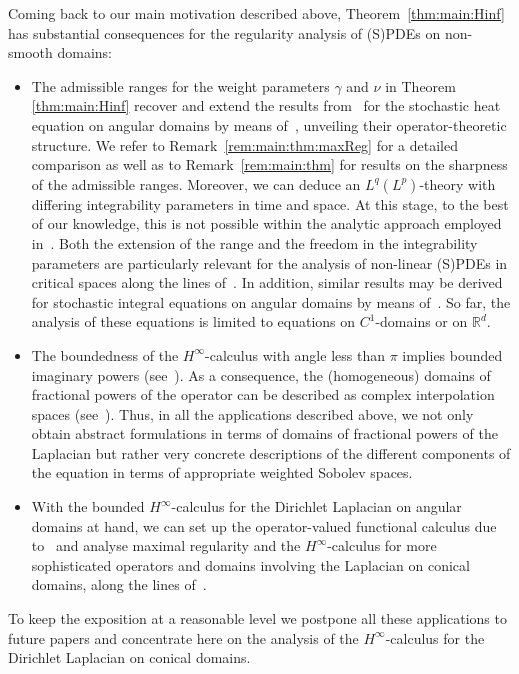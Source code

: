 \documentclass[12pt,a4paper, reqno]{amsart}
\theoremstyle{plain}
\theoremstyle{definition}
\theoremstyle{remark}
\numberwithin{equation}{section}
\newcommand{\1}{\mathbbm{1}}
\newcommand{\R}{\ensuremath{\mathbb{R}}}
\begin{document}
Coming back to our main motivation described above, Theorem~\ref{thm:main:Hinf} has substantial consequences for the regularity analysis of (S)PDEs on non-smooth domains:
\begin{itemize}
\item The admissible ranges
for the weight parameters $\gamma$ and $\nu$ in Theorem \ref{thm:main:Hinf} recover and extend the results from~\cite{ Cio20, CioKimLee2019, CioKimKyeLeeLin2018, KimLeeSeo2021,KimLeeSeo2022b} for the stochastic heat equation on angular domains by means of~\cite{NeeVerWei2012b,NeeVerWei2012}, unveiling their operator-theoretic structure. We refer to Remark~\ref{rem:main:thm:maxReg} for a detailed comparison as well as to Remark~\ref{rem:main:thm} for results on the sharpness of the admissible ranges. 
Moreover, we can deduce an $L^q(L^p)$-theory with differing integrability parameters in time and space.
At this stage, to the best of our knowledge, this is not possible within the analytic approach employed in~\cite{KimLeeSeo2021,KimLeeSeo2022b}.
Both the extension of the range and the freedom in the integrability parameters are particularly relevant for the analysis of non-linear (S)PDEs in critical spaces along the lines of~\cite{AgrestiVeraar2022a, AgrestiVeraar2022b, AgrVer2025}.
In addition, similar results may be derived for stochastic integral equations on angular domains by means of~\cite{DesLon2013}.
So far, the analysis of these equations is  limited to equations on $C^1$-domains or on $\R^d$.
\item The boundedness of the $H^\infty$-calculus with angle less than $\pi$ implies bounded imaginary powers (see~\cite{CowlingDoustMcIntoshYagi1996}). As a consequence, the (homogeneous) domains of fractional powers of the operator can be described as complex interpolation spaces (see~\cite[Theorem~15.3.9]{aibs3}).
Thus, in all the applications described above, we not only obtain abstract formulations in terms of domains of fractional powers of the Laplacian but rather very concrete descriptions of the different components of the equation in terms of appropriate weighted Sobolev spaces.
\item With the bounded $H^\infty$-calculus for the  Dirichlet Laplacian on angular domains at hand, we can set up the operator-valued functional calculus due to~\cite{Kalton2001TheH} and analyse maximal regularity and the $H^\infty$-calculus for more sophisticated operators and domains involving the Laplacian on conical domains, along the lines of~\cite[Section~5]{Prss2007HinftycalculusFT}.
\end{itemize}
To keep the exposition at a reasonable level we postpone all these applications to future papers and concentrate here on the analysis of the $H^\infty$-calculus for the Dirichlet Laplacian on conical domains.
\end{document}
